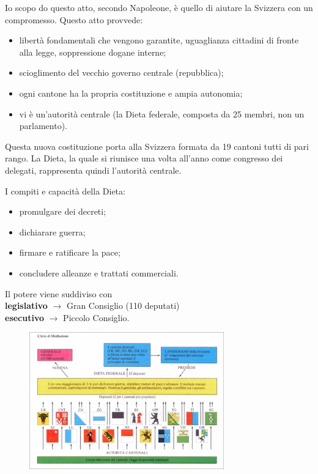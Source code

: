 \documentclass[a4paper]{article}
\begin{document}

Io scopo do questo atto, secondo Napoleone, è quello di aiutare la Svizzera con un compromesso.
Questo atto provvede:
\begin{itemize}
    \item libertà fondamentali che vengono garantite, uguaglianza cittadini di fronte alla legge, soppressione dogane interne;
    \item scioglimento del vecchio governo centrale (repubblica);
    \item ogni cantone ha la propria costituzione e ampia autonomia;
    \item vi è un'autorità centrale (la Dieta federale, composta da 25 membri, non un parlamento).
\end{itemize}

Questa nuova costituzione porta alla Svizzera formata da 19 cantoni tutti di pari rango.
La Dieta, la quale si riunisce una volta all'anno come congresso dei delegati,
rappresenta quindi l'autorità centrale.

I compiti e capacità della Dieta:
\begin{itemize}
    \item promulgare dei decreti;
    \item dichiarare guerra;
    \item firmare e ratificare la pace;
    \item concludere alleanze e trattati commerciali.
\end{itemize}

Il potere viene suddiviso con \\
\textbf{legislativo} \(\rightarrow\) Gran Consiglio (110 deputati) \\
\textbf{esecutivo} \(\rightarrow\) Piccolo Consiglio.

\begin{figure}[h]
    \centering
    \includegraphics[width=0.75\textwidth]{./mediazione.png}
\end{figure}
\end{document}

